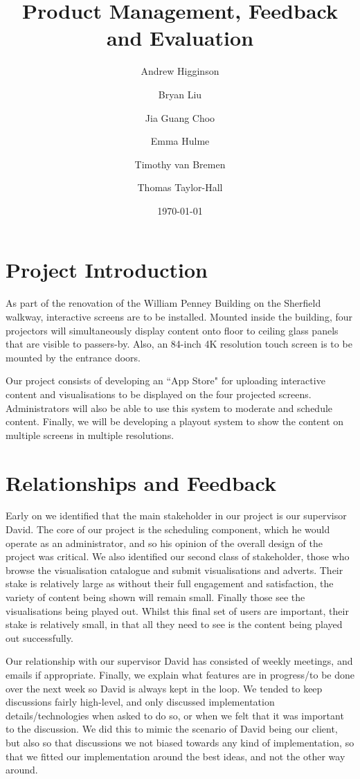 \documentclass[a4paper]{article}
\begin{document}
\title{Product Management, Feedback and Evaluation}
\author{Andrew Higginson \and Bryan Liu \and Jia Guang Choo \and Emma Hulme \and 
Timothy van Bremen \and Thomas Taylor-Hall}
\date{\today}
\maketitle

\setcounter{table}{0}
\linespread{1.15}

\section{Project Introduction}
As part of the renovation of the William Penney Building on the Sherfield 
walkway, interactive screens are to be installed. Mounted inside the building,
four projectors will simultaneously display content onto floor to ceiling glass
panels that are visible to passers-by. Also, an 84-inch 4K resolution touch 
screen is to be mounted by the entrance doors. 

Our project consists of developing an ``App Store" for uploading interactive 
content and visualisations to be displayed on the four projected screens. 
Administrators will also be able to use this system to moderate and schedule 
content. Finally, we will be developing a playout system to show the content 
on multiple screens in multiple resolutions.

\section{Relationships and Feedback}
Early on we identified that the main stakeholder in our project is our supervisor David. The core of our project is the scheduling component, which he would operate as an administrator, and so his opinion of the overall design of the project was critical. We also identified our second class of stakeholder, those who browse the visualisation catalogue and submit visualisations and adverts. Their stake is relatively large as without their full engagement and satisfaction, the variety of content being shown will remain small. Finally those see the visualisations being played out. Whilst this final set of users are important, their stake is relatively small, in that all they need to see is the content being played out successfully.

Our relationship with our supervisor David has consisted of weekly 
meetings, and emails if appropriate. Finally, we explain what features are in progress/to be done over the next week so David is 
always kept in the loop. We tended to keep discussions fairly high-level, and only discussed implementation details/technologies when asked to do so, or when we felt that it was important to the discussion. We did this to mimic the scenario of David being our client, but also so that discussions we not biased towards any kind of implementation, so that we fitted our implementation around the best ideas, and not the other way around.
\end{document}
